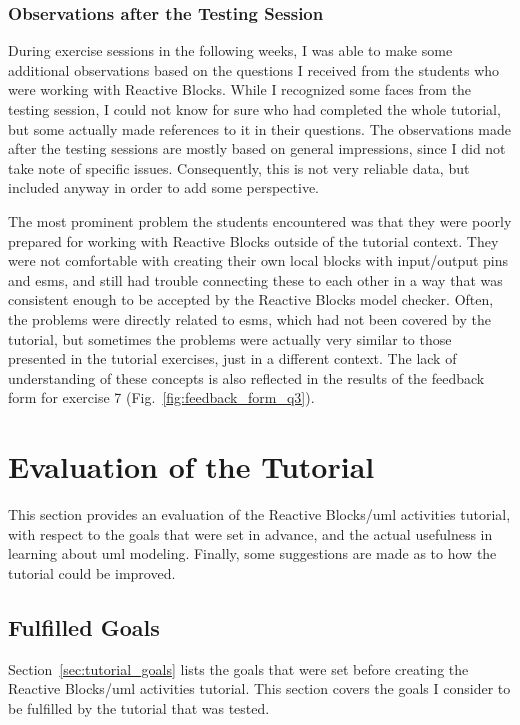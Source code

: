 \subsubsection{Observations after the Testing Session}
During exercise sessions in the following weeks, I was able to make some additional observations based on the questions I received from the students who were working with Reactive Blocks. While I recognized some faces from the testing session, I could not know for sure who had completed the whole tutorial, but some actually made references to it in their questions. The observations made after the testing sessions are mostly based on general impressions, since I did not take note of specific issues. Consequently, this is not very reliable data, but included anyway in order to add some perspective.

\noindent
The most prominent problem the students encountered was that they were poorly prepared for working with Reactive Blocks outside of the tutorial context. They were not comfortable with creating their own local blocks with input/output pins and \glspl{esm}, and still had trouble connecting these to each other in a way that was consistent enough to be accepted by the Reactive Blocks model checker. Often, the problems were directly related to \glspl{esm}, which had not been covered by the tutorial, but sometimes the problems were actually very similar to those presented in the tutorial exercises, just in a different context. The lack of understanding of these concepts is also reflected in the results of the feedback form for exercise 7 (Fig.~\ref{fig:feedback_form_q3}).

\section{Evaluation of the Tutorial}
\label{sec:tutorial_evaluation}
This section provides an evaluation of the Reactive Blocks/\gls{uml} activities tutorial, with respect to the goals that were set in advance, and the actual usefulness in learning about \gls{uml} modeling. Finally, some suggestions are made as to how the tutorial could be improved.

\subsection{Fulfilled Goals}
\label{sec:tutorial_goals_fulfilled}
Section~\ref{sec:tutorial_goals} lists the goals that were set before creating the Reactive Blocks/\gls{uml} activities tutorial. This section covers the goals I consider to be fulfilled by the tutorial that was tested.

